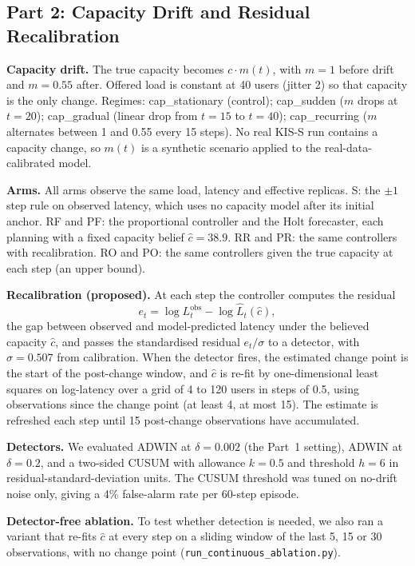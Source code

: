 \subsection{Part 2: Capacity Drift and Residual Recalibration}
\textbf{Capacity drift.} The true capacity becomes $c\cdot m(t)$, with $m=1$ before drift and $m=0.55$ after. Offered load is constant at 40 users (jitter 2) so that capacity is the only change. Regimes: cap\_stationary (control); cap\_sudden ($m$ drops at $t=20$); cap\_gradual (linear drop from $t=15$ to $t=40$); cap\_recurring ($m$ alternates between 1 and 0.55 every 15 steps). No real KIS-S run contains a capacity change, so $m(t)$ is a synthetic scenario applied to the real-data-calibrated model.

\textbf{Arms.} All arms observe the same load, latency and effective replicas. S: the $\pm1$ step rule on observed latency, which uses no capacity model after its initial anchor. RF and PF: the proportional controller and the Holt forecaster, each planning with a fixed capacity belief $\hat c=38.9$. RR and PR: the same controllers with recalibration. RO and PO: the same controllers given the true capacity at each step (an upper bound).

\textbf{Recalibration (proposed).} At each step the controller computes the residual
\begin{equation}
e_t = \log L_t^{\mathrm{obs}} - \log \hat L_t(\hat c),
\end{equation}
the gap between observed and model-predicted latency under the believed capacity $\hat c$, and passes the standardised residual $e_t/\sigma$ to a detector, with $\sigma=0.507$ from calibration. When the detector fires, the estimated change point is the start of the post-change window, and $\hat c$ is re-fit by one-dimensional least squares on log-latency over a grid of 4 to 120 users in steps of 0.5, using observations since the change point (at least 4, at most 15). The estimate is refreshed each step until 15 post-change observations have accumulated.

\textbf{Detectors.} We evaluated ADWIN at $\delta=0.002$ (the Part~1 setting), ADWIN at $\delta=0.2$, and a two-sided CUSUM \cite{page1954} with allowance $k=0.5$ and threshold $h=6$ in residual-standard-deviation units. The CUSUM threshold was tuned on no-drift noise only, giving a 4\% false-alarm rate per 60-step episode.

\textbf{Detector-free ablation.} To test whether detection is needed, we also ran a variant that re-fits $\hat c$ at every step on a sliding window of the last 5, 15 or 30 observations, with no change point (\texttt{run\_continuous\_ablation.py}).

